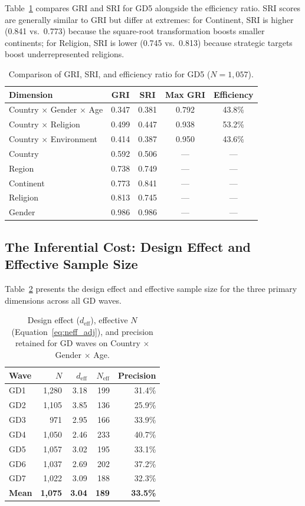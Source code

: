 \documentclass[11pt,a4paper]{article}
\begin{document}
Table~\ref{tab:variants} compares GRI and SRI for GD5 alongside the efficiency ratio. SRI scores are generally similar to GRI but differ at extremes: for Continent, SRI is higher (0.841 vs.\ 0.773) because the square-root transformation boosts smaller continents; for Religion, SRI is lower (0.745 vs.\ 0.813) because strategic targets boost underrepresented religions.

\begin{table}[ht]
\centering
\caption{Comparison of GRI, SRI, and efficiency ratio for GD5 ($N = 1{,}057$).}
\label{tab:variants}
\begin{tabular}{@{}lcccc@{}}
\toprule
Dimension & GRI & SRI & Max GRI & Efficiency \\
\midrule
Country $\times$ Gender $\times$ Age & 0.347 & 0.381 & 0.792 & 43.8\% \\
Country $\times$ Religion & 0.499 & 0.447 & 0.938 & 53.2\% \\
Country $\times$ Environment & 0.414 & 0.387 & 0.950 & 43.6\% \\
Country & 0.592 & 0.506 & --- & --- \\
Region & 0.738 & 0.749 & --- & --- \\
Continent & 0.773 & 0.841 & --- & --- \\
Religion & 0.813 & 0.745 & --- & --- \\
Gender & 0.986 & 0.986 & --- & --- \\
\bottomrule
\end{tabular}
\end{table}

\subsection{The Inferential Cost: Design Effect and Effective Sample Size}

Table~\ref{tab:deff} presents the design effect and effective sample size for the three primary dimensions across all GD waves.

\begin{table}[ht]
\centering
\caption{Design effect ($d_{\text{eff}}$), effective $N$ (Equation~\ref{eq:neff_adj}), and precision retained for GD waves on Country $\times$ Gender $\times$ Age.}
\label{tab:deff}
\begin{tabular}{@{}lrrrr@{}}
\toprule
Wave & $N$ & $d_{\text{eff}}$ & $N_{\text{eff}}$ & Precision \\
\midrule
GD1 & 1,280 & 3.18 & 199 & 31.4\% \\
GD2 & 1,105 & 3.85 & 136 & 25.9\% \\
GD3 & 971 & 2.95 & 166 & 33.9\% \\
GD4 & 1,050 & 2.46 & 233 & 40.7\% \\
GD5 & 1,057 & 3.02 & 195 & 33.1\% \\
GD6 & 1,037 & 2.69 & 202 & 37.2\% \\
GD7 & 1,022 & 3.09 & 188 & 32.3\% \\
\midrule
\textbf{Mean} & \textbf{1,075} & \textbf{3.04} & \textbf{189} & \textbf{33.5\%} \\
\bottomrule
\end{tabular}
\end{table}
\end{document}
